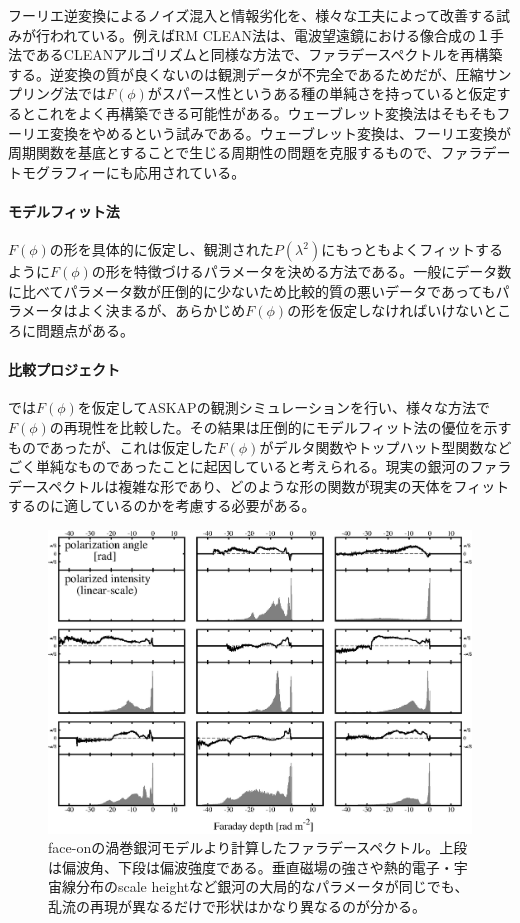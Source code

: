 フーリエ逆変換によるノイズ混入と情報劣化を、様々な工夫によって改善する試みが行われている。例えばRM CLEAN法は、電波望遠鏡における像合成の１手法であるCLEANアルゴリズムと同様な方法で、ファラデースペクトルを再構築する\citep{2009IAUS..259..591H,2014PASJ...66...61K}。逆変換の質が良くないのは観測データが不完全であるためだが、圧縮サンプリング法では$F(\phi)$がスパース性というある種の単純さを持っていると仮定するとこれをよく再構築できる可能性がある\citep{2011A&A...531A.126L}。ウェーブレット変換法はそもそもフーリエ変換をやめるという試みである。ウェーブレット変換は、フーリエ変換が周期関数を基底とすることで生じる周期性の問題を克服するもので、ファラデートモグラフィーにも応用されている\citep{2010MNRAS.401L..24F}。

\paragraph{モデルフィット法}

$F(\phi)$の形を具体的に仮定し、観測された$P(\lambda^2)$にもっともよくフィットするように$F(\phi)$の形を特徴づけるパラメータを決める方法である。一般にデータ数に比べてパラメータ数が圧倒的に少ないため比較的質の悪いデータであってもパラメータはよく決まるが、あらかじめ$F(\phi)$の形を仮定しなければいけないところに問題点がある。

\paragraph{比較プロジェクト}

\cite{1409.4151}では$F(\phi)$を仮定してASKAPの観測シミュレーションを行い、様々な方法で$F(\phi)$の再現性を比較した。その結果は圧倒的にモデルフィット法の優位を示すものであったが、これは仮定した$F(\phi)$がデルタ関数やトップハット型関数などごく単純なものであったことに起因していると考えられる。現実の銀河のファラデースペクトルは複雑な形であり、どのような形の関数が現実の天体をフィットするのに適しているのかを考慮する必要がある。

\begin{figure}[tbp]
\begin{center}
\includegraphics[width=0.7\linewidth]{magnetism/c06.s1.ss8.f2.eps}
\end{center}
\caption{face-onの渦巻銀河モデルより計算したファラデースペクトル\citep{2014PASJ...66....5I}。上段は偏波角、下段は偏波強度である。垂直磁場の強さや熱的電子・宇宙線分布のscale heightなど銀河の大局的なパラメータが同じでも、乱流の再現が異なるだけで形状はかなり異なるのが分かる。
}\label{c06.s1.ss8.f2}
\end{figure}

